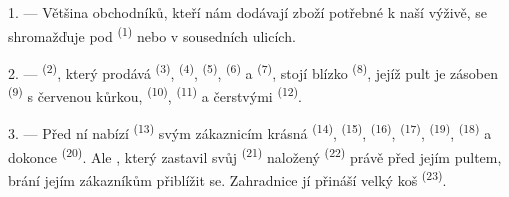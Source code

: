 %
%
%

\VUsaut{4.0mm}
\VUsaut{3.0mm}

\VUsaut{3.0mm}

1. --- Většina obchodníků, kteří nám dodávají zboží potřebné k naší výživě, se
shromažďuje pod  \textsuperscript{(1)}  nebo v
sousedních ulicích.

2. ---  \textsuperscript{(2)}, který prodává 
\textsuperscript{(3)},  \textsuperscript{(4)}, 
\textsuperscript{(5)},  \textsuperscript{(6)} a 
\textsuperscript{(7)}, stojí blízko 
\textsuperscript{(8)}, jejíž pult je zásoben 
\textsuperscript{(9)} s červenou kůrkou, 
\textsuperscript{(10)},  \textsuperscript{(11)} a čerstvými
 \textsuperscript{(12)}.

3. --- Před ní nabízí  \textsuperscript{(13)} svým
zákaznicím krásná  \textsuperscript{(14)}, 
\textsuperscript{(15)},  \textsuperscript{(16)}, 
\textsuperscript{(17)},  \textsuperscript{(19)}, 
\textsuperscript{(18)} a dokonce  \textsuperscript{(20)}. Ale
, který zastavil svůj 
\textsuperscript{(21)} naložený  \textsuperscript{(22)} právě před
jejím pultem, brání jejím zákazníkům přiblížit se. Zahradnice jí přináší velký koš
 \textsuperscript{(23)}.

